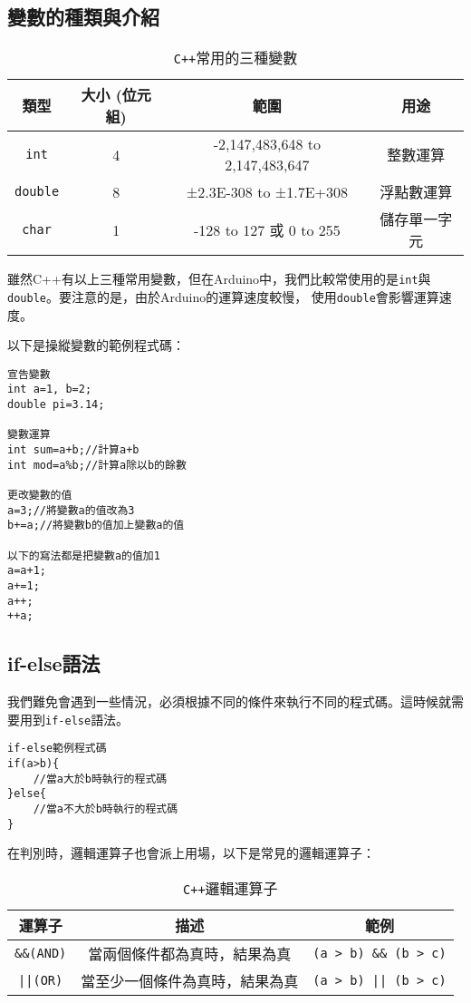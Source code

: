 \documentclass[12pt,a4paper]{article}
\begin{document}
\subsection{變數的種類與介紹}

\begin{table}[h!]
\centering
\begin{tabular}{|c||c|c|c|}
\hline
\textbf{類型} & \textbf{大小 (位元組)} & \textbf{範圍} & \textbf{用途} \\ \hline
\texttt{int} & 4 & -2,147,483,648 to 2,147,483,647 & 整數運算 \\ \hline
\texttt{double} & 8 & ±2.3E-308 to ±1.7E+308 & 浮點數運算 \\ \hline
\texttt{char} & 1 & -128 to 127 或 0 to 255 & 儲存單一字元 \\ \hline
\end{tabular}
\caption{\texttt{C++}常用的三種變數}
\label{tab:datatype_comparison}
\end{table}

雖然C++有以上三種常用變數，但在Arduino中，我們比較常使用的是\texttt{int}與\texttt{double}。要注意的是，由於Arduino的運算速度較慢，
使用\texttt{double}會影響運算速度。

以下是操縱變數的範例程式碼：


\begin{lstlisting}
宣告變數
int a=1, b=2;
double pi=3.14;

變數運算
int sum=a+b;//計算a+b
int mod=a%b;//計算a除以b的餘數

更改變數的值
a=3;//將變數a的值改為3
b+=a;//將變數b的值加上變數a的值

以下的寫法都是把變數a的值加1
a=a+1;
a+=1;
a++;
++a;
\end{lstlisting}
    
\subsection{if-else語法}
我們難免會遇到一些情況，必須根據不同的條件來執行不同的程式碼。這時候就需要用到\texttt{if-else}語法。


\begin{lstlisting}
if-else範例程式碼
if(a>b){
    //當a大於b時執行的程式碼
}else{
    //當a不大於b時執行的程式碼
}
\end{lstlisting}

在判別時，邏輯運算子也會派上用場，以下是常見的邏輯運算子：
\begin{table}[h!]
\centering
\begin{tabular}{|c|c|c|}
\hline
\textbf{運算子} & \textbf{描述} & \textbf{範例} \\ \hline
\texttt{\&\&(AND)}  & 當兩個條件都為真時，結果為真 & \texttt{(a > b) \&\& (b > c)} \\ \hline
\texttt{||(OR)}  & 當至少一個條件為真時，結果為真 & \texttt{(a > b) || (b > c)} \\ \hline
\end{tabular}
\caption{\texttt{C++}邏輯運算子}
\label{tab:logical_bitwise_operators}
\end{table}
\end{document}
